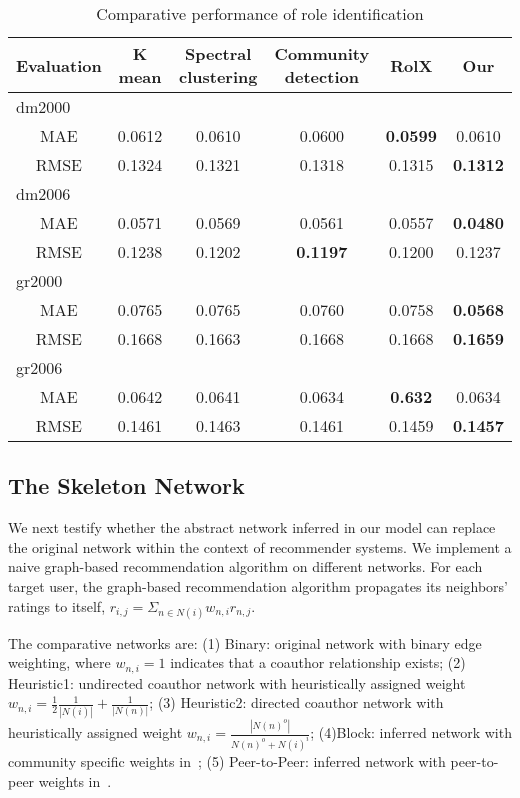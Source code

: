 \documentclass{ieeeaccess}
\begin{document}
\begin{table*}[htbp]
\caption{Comparative performance of role identification}
\centering
\begin{tabular}{|c|c|c|c|c|c|}
\hline
Evaluation &K mean	&Spectral clustering	&Community detection  & RolX &	Our\\\hline
\multicolumn{6}{|l|}{dm2000} \\\hline
MAE	 & 0.0612&0.0610&0.0600 &\textbf{0.0599} &0.0610\\\hline
RMSE	&0.1324&0.1321&0.1318&0.1315&\textbf{0.1312}\\\hline
\multicolumn{6}{|l|}{dm2006} \\\hline				
MAE	 & 0.0571 &0.0569&0.0561&0.0557&\textbf{0.0480}\\\hline
RMSE &0.1238&0.1202 &\textbf{0.1197} &0.1200&0.1237\\\hline
\multicolumn{6}{|l|}{gr2000}			\\\hline	
MAE	&0.0765&0.0765&0.0760&0.0758&\textbf{0.0568}\\\hline
RMSE	&0.1668&0.1663&0.1668&0.1668&\textbf{0.1659}\\\hline
\multicolumn{6}{|l|}{gr2006}			\\\hline
MAE	&0.0642&0.0641&0.0634&\textbf{0.632}&0.0634\\\hline
RMSE	&0.1461	&0.1463	&0.1461	&0.1459	&\textbf{0.1457}\\\hline
\end{tabular}\label{tab:indent}
\end{table*}


\subsection{The Skeleton Network}
We next testify whether the abstract network inferred in our model can replace the original network within the context of recommender systems. We implement a naive graph-based recommendation algorithm on different networks. For each target user, the graph-based recommendation algorithm propagates its neighbors' ratings to itself, $r_{i,j}=\Sigma_{n\in N(i)} w_{n,i} r_{n,j}$.

The comparative networks are: (1) Binary: original network with binary edge weighting, where $w_{n,i}=1$ indicates that a coauthor relationship exists; (2) Heuristic1: undirected coauthor network with heuristically assigned  weight $w_{n,i}=\frac{1}{2}{\frac{1}{|N(i)|}+\frac{1}{|N(n)|}}$; (3) Heuristic2: directed coauthor network with heuristically assigned weight $w_{n,i} = \frac{|N(n)^o|}{N(n)^o+N(i)^i}$; (4)Block: inferred network with community specific weights in~\cite{Jamali2011Generalized}; (5) Peer-to-Peer: inferred network with peer-to-peer weights in~\cite{AuYeung2011Strength}.
\end{document}
